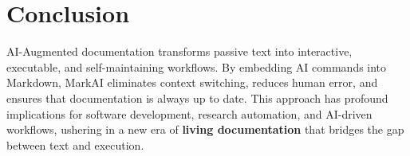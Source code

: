 \documentclass{article}
\begin{document}
\section{Conclusion}
AI-Augmented documentation transforms passive text into interactive, executable, and self-maintaining workflows. By embedding AI commands into Markdown, MarkAI eliminates context switching, reduces human error, and ensures that documentation is always up to date. This approach has profound implications for software development, research automation, and AI-driven workflows, ushering in a new era of \textbf{living documentation} that bridges the gap between text and execution.
\end{document}
